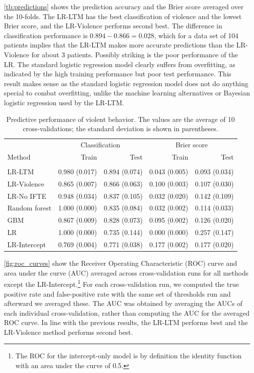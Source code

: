 \documentclass[a4paper,11pt]{article}
\begin{document}
\autoref{tb:predictions} shows the prediction accuracy and the Brier score averaged over the 10-folds.
The LR-LTM has the best classification of violence and the lowest Brier score, and the LR-Violence performs second best.
The difference in classification performance is $0.894 - 0.866 = 0.028$, which for a data set of 104 patients implies that the LR-LTM makes more accurate predictions than the LR-Violence for about 3 patients.
Possibly striking is the poor performance of the LR.
The standard logistic regression model clearly suffers from overfitting, as indicated by the high training performance but poor test performance. This result makes sense as the standard logistic regression model does not do anything special to combat overfitting, unlike the machine learning alternatives or Bayesian logistic regression used by the LR-LTM.


\begin{table}[!ht]
    \caption{Predictive performance of violent behavior. The values are the average of 10 cross-validations; the standard deviation is shown in parentheses.}
    \label{tb:predictions}
    \centering
    \begin{tabular}{lrrrr}
        \toprule
        & \multicolumn{2}{c}{Classification} & \multicolumn{2}{c}{Brier score}\\
        \cmidrule(lr){2-3}  \cmidrule(lr){4-5}
        Method & Train & Test & Train & Test \\
        \midrule \\
        LR-LTM & 0.980 (0.017) & 0.894 (0.074) & 0.043 (0.005) & 0.093 (0.034) \\
        LR-Violence & 0.865 (0.007) & 0.866 (0.063) & 0.100 (0.003) & 0.107 (0.030) \\
        LR-No IFTE & 0.948 (0.034) & 0.837 (0.105) & 0.032 (0.020) & 0.142 (0.109) \\
        Random forest & 1.000 (0.000) & 0.835 (0.084) & 0.032 (0.002) & 0.114 (0.033) \\
        GBM & 0.867 (0.009) & 0.828 (0.073) & 0.095 (0.002) & 0.126 (0.020) \\
        LR & 1.000 (0.000) & 0.735 (0.144) & 0.000 (0.000) & 0.257 (0.147) \\
        LR-Intercept & 0.769 (0.004) & 0.771 (0.038) & 0.177 (0.002) & 0.177 (0.020) \\
        \bottomrule
    \end{tabular}
\end{table}

\autoref{fig:roc_curves} show the Receiver Operating Characteristic (ROC) curve and area under the curve (AUC) averaged across cross-validation runs for all methods except the LR-Intercept.\footnote{The ROC for the intercept-only model is by definition the identity function with an area under the curve of 0.5.}
For each cross-validation run, we computed the true positive rate and false-positive rate with the same set of thresholds run and afterward we averaged these.
The AUC was obtained by averaging the AUCs of each individual cross-validation, rather than computing the AUC for the averaged ROC curve.
In line with the previous results, the LR-LTM performs best and the LR-Violence method performs second best.
\end{document}
